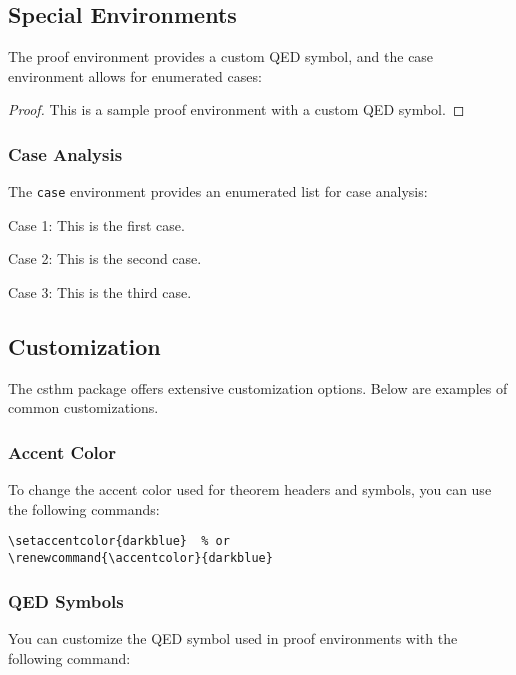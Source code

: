 \documentclass{amsart}
\newcommand{\env}[1]{\texttt{#1}}
\newcommand{\pkg}[1]{\textsf{#1}}
\begin{document}
\subsection{Special Environments}

The proof environment provides a custom QED symbol, and the case environment allows for enumerated cases:

\begin{proof}
	This is a sample proof environment with a custom QED symbol.
\end{proof}

\subsubsection{Case Analysis}

The \env{case} environment provides an enumerated list for case analysis:

\begin{case}
	\item Case 1: This is the first case.
	\item Case 2: This is the second case.
	\item Case 3: This is the third case.
\end{case}

\subsection{Customization}

The \pkg{csthm} package offers extensive customization options. Below are examples of common customizations.

\subsubsection{Accent Color}

To change the accent color used for theorem headers and symbols, you can use the following commands:

\begin{verbatim}
\setaccentcolor{darkblue}  % or
\renewcommand{\accentcolor}{darkblue}
\end{verbatim}

\subsubsection{QED Symbols}

You can customize the QED symbol used in proof environments with the following command:
\end{document}
